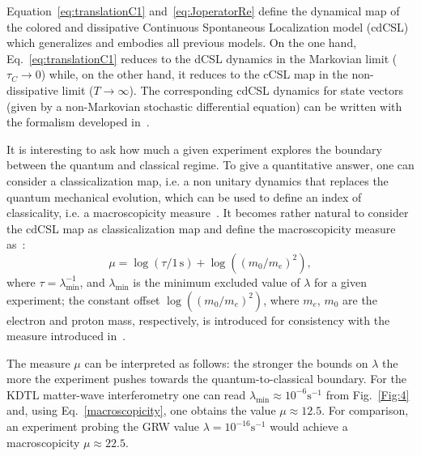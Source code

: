 \documentclass[prl,twocolumn,showpacs,superscriptaddress,groupedaddress]{revtex4}
\begin{document}
Equation~\eqref{eq:translationC1} and~\eqref{eq:JoperatorRe} define the dynamical map of the colored and dissipative Continuous Spontaneous Localization model (cdCSL) which generalizes and embodies all previous models. On the one hand, Eq.~\eqref{eq:translationC1} reduces to the dCSL dynamics in the Markovian limit ($\tau_{C}\rightarrow0$) while, on the other hand, it reduces to the cCSL map in the non-dissipative limit ($T\rightarrow\infty$). The corresponding cdCSL dynamics for state vectors (given by a non-Markovian stochastic differential equation) can be written with the formalism developed in~\cite{1751-8121-40-50-012,1751-8121-41-39-395308}. 


It is interesting to ask how much a given experiment explores the boundary between the quantum and classical regime. To give a quantitative answer, one can consider a classicalization map, i.e. a non unitary dynamics that replaces the quantum mechanical evolution, which can be used to define an index of classicality, i.e. a macroscopicity measure~\cite{nimmrichter2013macroscopicity,nimmrichter2014macroscopic}. It becomes rather natural to consider the cdCSL map as classicalization map and define the macroscopicity measure as~\cite{gasbarri2017general}:
\begin{equation}
\mu=\log (\tau/1\,\text{s})+\log ((m_0/m_e)^2),
\label{macroscopicity}
\end{equation}
where $\tau=\lambda_{\text{min}}^{-1}$, and $\lambda_{\text{min}}$ is the minimum excluded value of $\lambda$ for a given experiment; the constant offset $\log ((m_0/m_e)^2)$, where $m_e$, $m_0$ are the electron and proton mass, respectively, is introduced for consistency with the measure introduced in~\cite{nimmrichter2013macroscopicity}.  

The measure $\mu$ can be interpreted as follows: the stronger the bounds on $\lambda$ the more the experiment pushes towards the quantum-to-classical boundary. For the KDTL matter-wave interferometry one can read $\lambda_{\text{min}}\approx 10^{-6}\text{s}^{-1}$ from Fig.~\ref{Fig:4} and, using Eq.~\eqref{macroscopicity}, one obtains the value $\mu \approx 12.5$. For comparison, an experiment probing the GRW value $\lambda=10^{-16} \text{s}^{-1}$ would achieve a  macroscopicity $\mu \approx 22.5$. 
 
\end{document}
